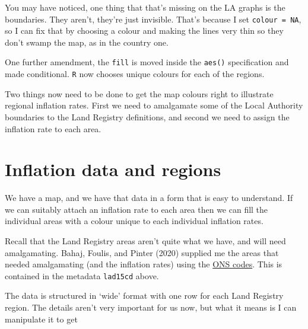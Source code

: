 \documentclass[
  letterpaper,
]{book}
\begin{document}
You may have noticed, one thing that that's missing on the LA graphs is
the boundaries. They aren't, they're just invisible. That's because I
set \texttt{colour\ =\ NA}, so I can fix that by choosing a colour and
making the lines very thin so they don't swamp the map, as in the
country one.

One further amendment, the \texttt{fill} is moved inside the
\texttt{aes()} specification and made conditional. \texttt{R} now
chooses unique colours for each of the regions.

Two things now need to be done to get the map colours right to
illustrate regional inflation rates. First we need to amalgamate some of
the Local Authority boundaries to the Land Registry definitions, and
second we need to assign the inflation rate to each area.

\hypertarget{inflation-data-and-regions}{%
\section{Inflation data and regions}\label{inflation-data-and-regions}}

We have a map, and we have that data in a form that is easy to
understand. If we can suitably attach an inflation rate to each area
then we can fill the individual areas with a colour unique to each
individual inflation rates.

Recall that the Land Registry areas aren't quite what we have, and will
need amalgamating. Bahaj, Foulis, and Pinter (2020) supplied me the
areas that needed amalgamating (and the inflation rates) using the
\href{https://en.wikipedia.org/wiki/ONS_coding_system}{ONS codes}. This
is contained in the metadata \texttt{lad15cd} above.

The data is structured in `wide' format with one row for each Land
Registry region. The details aren't very important for us now, but what
it means is I can manipulate it to get
\end{document}
